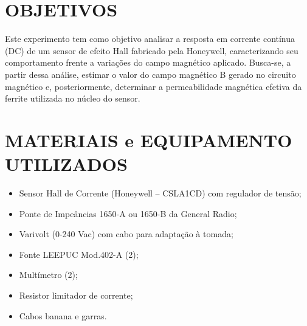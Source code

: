 \documentclass[10pt,twocolumn,letterpaper]{article}
\begin{document}

\section{OBJETIVOS}

\hspace{1cm} Este experimento tem como objetivo analisar a resposta em corrente contínua (DC) de um sensor de efeito Hall fabricado pela Honeywell, caracterizando seu comportamento frente a variações do campo magnético aplicado. Busca-se, a partir dessa análise, estimar o valor do campo magnético B
 gerado no circuito magnético e, posteriormente, determinar a permeabilidade magnética efetiva da ferrite utilizada no núcleo do sensor.



\section{MATERIAIS e EQUIPAMENTO UTILIZADOS}

\begin{itemize}
    \item Sensor Hall de Corrente (Honeywell – CSLA1CD) com
regulador de tensão;
    \item Ponte de Impeâncias 1650-A ou 1650-B da General
    Radio;
    \item Varivolt (0-240 Vac) com cabo para adaptação à tomada;
    \item Fonte LEEPUC Mod.402-A (2);
    \item Multímetro (2);
    \item Resistor limitador de corrente;
    \item Cabos banana e garras.
\end{itemize}
\end{document}

